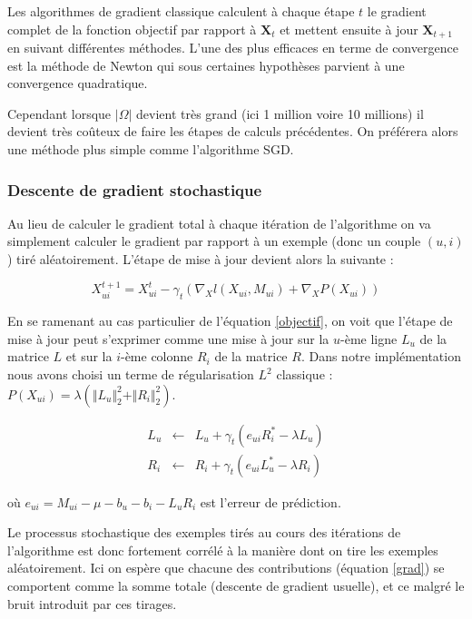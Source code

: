 \documentclass[10pt,a4paper]{article}
\begin{document}
Les algorithmes de gradient classique calculent à chaque étape $t$ le gradient complet de la fonction objectif par rapport à $\textbf{X}_t$ et mettent ensuite à jour $\textbf{X}_{t+1}$ en suivant différentes méthodes. L'une des plus efficaces en terme de convergence est la méthode de Newton qui sous certaines hypothèses parvient à une convergence quadratique. 

Cependant lorsque $| \Omega |$ devient très grand (ici 1 million voire 10 millions) il devient très coûteux de faire les étapes de calculs précédentes. On préférera alors une méthode plus simple comme l'algorithme SGD.

\subsubsection*{Descente de gradient stochastique}

Au lieu de calculer le gradient total à chaque itération de l'algorithme on va simplement calculer le gradient par rapport à un exemple (donc un couple $(u,i)$)  tiré aléatoirement. L'étape de mise à jour devient alors la suivante :

\begin{equation}
\label{grad}
X_{ui}^{t+1} = X_{ui}^t-\gamma_t\left(\nabla_Xl(X_{ui},M_{ui})+\nabla_XP(X_{ui})\right)
\end{equation}


En se ramenant au cas particulier de l'équation \eqref{objectif}, on voit que l'étape de mise à jour peut s'exprimer comme une mise à jour sur la $u$-ème ligne $L_u$ de la matrice $L$ et sur la $i$-ème colonne $R_i$ de la matrice $R$. Dans notre implémentation nous avons choisi un terme de régularisation $L^2$ classique \cite{koren}: $P(X_{ui}) = \lambda\left(\Vert L_u \Vert_2^2 + \Vert R_i \Vert_2^2\right)$.


\begin{eqnarray}
\label{grad1}
L_u & \leftarrow & L_u + \gamma_t\left(e_{ui}R_i^*-\lambda L_u  \right) \\
R_i & \leftarrow & R_i  + \gamma_t\left(e_{ui}L_u^*-\lambda R_i  \right)
\label{grad2}
\end{eqnarray}

où $e_{ui} = M_{ui} -  \mu - b_u  - b_i-L_{u}R_{i} $ est l'erreur de prédiction.

Le processus stochastique des exemples tirés au cours des itérations de l'algorithme est donc fortement corrélé à la manière dont on tire les exemples aléatoirement. Ici on espère que chacune des contributions (équation \eqref{grad}) se comportent comme la somme totale (descente de gradient usuelle), et ce malgré le bruit introduit par ces tirages.
\end{document}
